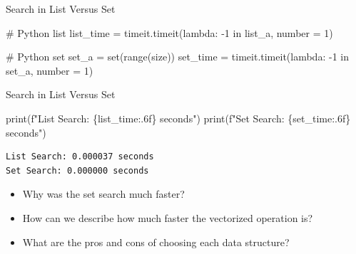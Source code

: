 \documentclass[
  ignorenonframetext,
]{beamer}
\newenvironment{Shaded}{\begin{snugshade}}{\end{snugshade}}
\newcommand{\BuiltInTok}[1]{\textcolor[rgb]{0.00,0.23,0.31}{#1}}
\newcommand{\CommentTok}[1]{\textcolor[rgb]{0.37,0.37,0.37}{#1}}
\newcommand{\DecValTok}[1]{\textcolor[rgb]{0.68,0.00,0.00}{#1}}
\newcommand{\KeywordTok}[1]{\textcolor[rgb]{0.00,0.23,0.31}{#1}}
\newcommand{\NormalTok}[1]{\textcolor[rgb]{0.00,0.23,0.31}{#1}}
\newcommand{\OperatorTok}[1]{\textcolor[rgb]{0.37,0.37,0.37}{#1}}
\newcommand{\SpecialCharTok}[1]{\textcolor[rgb]{0.37,0.37,0.37}{#1}}
\newcommand{\SpecialStringTok}[1]{\textcolor[rgb]{0.13,0.47,0.30}{#1}}
\begin{document}
\begin{frame}[fragile]{Search in List Versus Set}
\protect\hypertarget{search-in-list-versus-set}{}
\begin{Shaded}
\begin{Highlighting}[]
\CommentTok{\# Python list}
\NormalTok{list\_time }\OperatorTok{=}\NormalTok{ timeit.timeit(}\KeywordTok{lambda}\NormalTok{:}
  \OperatorTok{{-}}\DecValTok{1} \KeywordTok{in}\NormalTok{ list\_a, number }\OperatorTok{=} \DecValTok{1}\NormalTok{)}
  
\CommentTok{\# Python set}
\NormalTok{set\_a }\OperatorTok{=} \BuiltInTok{set}\NormalTok{(}\BuiltInTok{range}\NormalTok{(size))}
\NormalTok{set\_time }\OperatorTok{=}\NormalTok{ timeit.timeit(}\KeywordTok{lambda}\NormalTok{:}
  \OperatorTok{{-}}\DecValTok{1} \KeywordTok{in}\NormalTok{ set\_a, number }\OperatorTok{=} \DecValTok{1}\NormalTok{)}
\end{Highlighting}
\end{Shaded}
\end{frame}

\begin{frame}[fragile]{Search in List Versus Set}
\protect\hypertarget{search-in-list-versus-set-1}{}
\begin{Shaded}
\begin{Highlighting}[]
\BuiltInTok{print}\NormalTok{(}\SpecialStringTok{f"List Search: }\SpecialCharTok{\{}\NormalTok{list\_time}\SpecialCharTok{:.6f\}}\SpecialStringTok{ seconds"}\NormalTok{)}
\BuiltInTok{print}\NormalTok{(}\SpecialStringTok{f"Set Search: }\SpecialCharTok{\{}\NormalTok{set\_time}\SpecialCharTok{:.6f\}}\SpecialStringTok{ seconds"}\NormalTok{)}
\end{Highlighting}
\end{Shaded}

\begin{verbatim}
List Search: 0.000037 seconds
Set Search: 0.000000 seconds
\end{verbatim}

\begin{itemize}
\item
  Why was the set search much faster?
\item
  How can we describe how much faster the vectorized operation is?
\item
  What are the pros and cons of choosing each data structure?
\end{itemize}
\end{frame}
\end{document}
